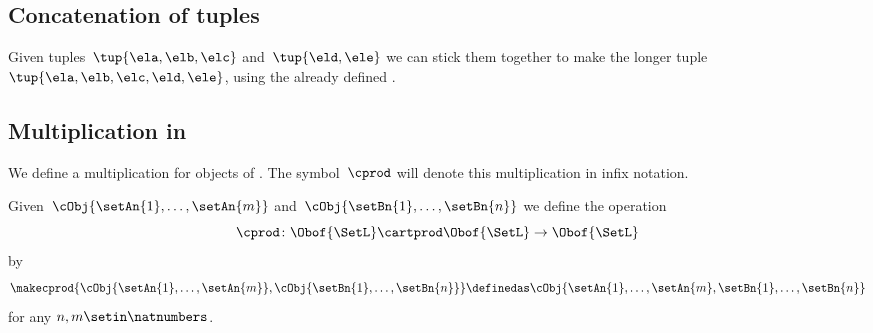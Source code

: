 \subsection{Concatenation of tuples}

Given tuples~$\tup{\ela, \elb, \elc}$ and~$\tup{\eld, \ele}$ we can stick them together to make the longer tuple~$\tup{\ela, \elb, \elc, \eld, \ele}$, using the already defined .


\subsection{Multiplication in \SetL}
\label{sec:multiplication-for-SetL}
We define a multiplication for objects of \SetL.
The symbol~$\cprod$ will denote this multiplication in infix notation.

Given~$\cObj{\setAn{1}, \ldots, \setAn{m}}$ and~$\cObj{\setBn{1}, \ldots, \setBn{n}}$ we define the operation
\begin{equation}
    \label{eq:mult-setl-sign}
    \cprod \colon \Obof{\SetL} \cartprod \Obof{\SetL} \to \Obof{\SetL}
\end{equation}
by
\begin{equation}
    \label{eq:strict-monoidal-product-sets}
    \makecprod{
        \cObj{\setAn{1}, \ldots, \setAn{m}},
        \cObj{\setBn{1}, \ldots, \setBn{n}}
    } \definedas \cObj{\setAn{1}, \ldots, \setAn{m}, \setBn{1}, \ldots, \setBn{n}}
\end{equation}
for any $n, m \setin \natnumbers$.

